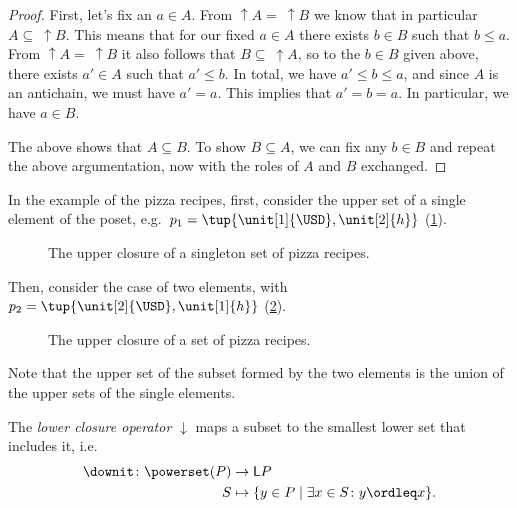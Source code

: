 \begin{proof}
    First, let's fix an $a \in A$. From $\uparrow A = \ \uparrow B$ we know that in particular $A \subseteq \ \uparrow B$. This means that for our fixed $a \in A$ there exists $b \in B$ such that $b \leq a$. From $\uparrow A = \ \uparrow B$ it also follows that $B \subseteq \ \uparrow A$, so to the  $b \in B$ given above, there exists $a' \in A$ such that $a' \leq b$. In total, we have $a' \leq b \leq a$, and since $A$ is an antichain, we must have $a' = a$. This implies that $a' = b = a$. In particular, we have $a \in B$.

    The above shows that $A \subseteq B$. To show $B \subseteq A$, we can fix any $b \in B$ and repeat the above argumentation, now with the roles of $A$ and $B$ exchanged.
\end{proof}

In the example of the pizza recipes, first, consider the upper set of a single element of the poset, e.g.~$p_1=\tup{\unit[1]{\USD},\unit[2]{h}}$  (\cref{fig:upperclosure_1}).
\begin{figure}[h!]
    \begin{center}
    \end{center}
    \caption{The upper closure of a singleton set of pizza recipes. \label{fig:upperclosure_1}}
\end{figure}
Then, consider the case of two elements, with~$p_2=\tup{\unit[2]{\USD},\unit[1]{h}}$ (\cref{fig:upperclosure_2}).

\begin{figure}[h!]
    \begin{center}
    \end{center}
    \caption{The upper closure of a set of pizza recipes. \label{fig:upperclosure_2}}
\end{figure}
Note that the upper set of the subset formed by the two elements is the union of the upper sets of the single elements.

\begin{definition}
    The \emph{lower closure operator} $\downarrow$ maps a subset to the smallest lower set that includes it, i.e.
    \begin{equation*}
        \begin{aligned}
            \downit \colon \powerset(P)&\to \mathsf{L}P\\
            S&\mapsto \{ y\in P \mid \exists x\in S \colon y\ordleq x\}.
        \end{aligned}
    \end{equation*}
\end{definition}

